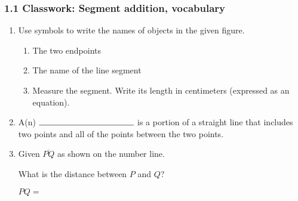 

\fancyhead[LE]{\thepage}



\subsubsection*{1.1 Classwork: Segment addition, vocabulary}
\begin{enumerate}
\item Use symbols to write the names of objects in the given figure.
\begin{multicols}{2}
   \par
\columnbreak
\begin{enumerate}[itemsep=1cm]
  \item The two endpoints
  \item The name of the line segment
  \item Measure the segment. Write its length in centimeters (expressed as an equation).
\end{enumerate}
\end{multicols} \vspace{1cm}

\item A(n) $\rule{4cm}{0.15mm}$ is a portion of a straight line that includes two points and all of the points between the two points. \bigskip

\item Given $\overline{PQ}$ as shown on the number line. \par \smallskip
   \par \smallskip
  What is the distance between $P$ and $Q$? \par \smallskip
    $PQ=$ \vspace{1cm}


\end{enumerate}
